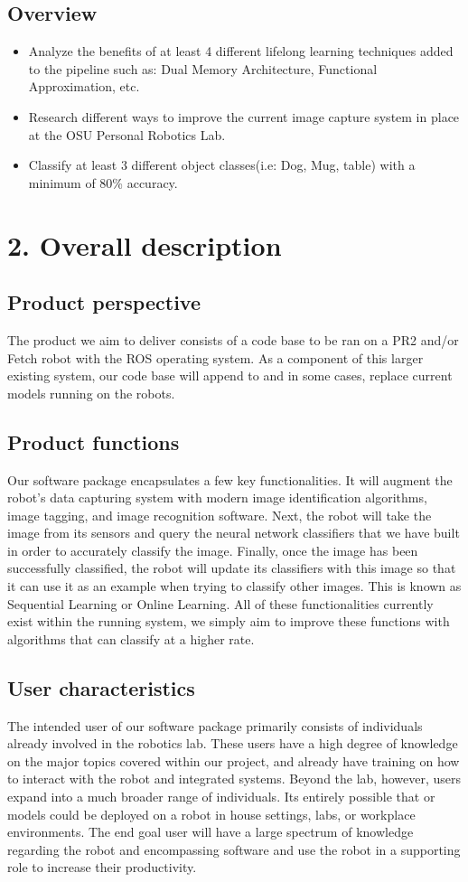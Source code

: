 \documentclass[draftclsnofoot, onecolumn, 10pt, compsoc]{IEEEtran}
\begin{document}
\subsection{Overview}
\begin{itemize}
\item Analyze the benefits of at least 4 different lifelong learning techniques added to the pipeline such as: Dual Memory Architecture, Functional Approximation, etc.
\item Research different ways to improve the current image capture system in place at the OSU Personal Robotics Lab. 
\item Classify at least 3 different object classes(i.e: Dog, Mug, table) with a minimum of 80\% accuracy.
\end{itemize}
\section{2. Overall description}
\subsection{Product perspective}
The product we aim to deliver consists of a code base to be ran on a PR2 and/or Fetch robot with the ROS operating system. As a component of this larger existing system, our code base will append to and in some cases, replace current models running on the robots. 

\subsection{Product functions}
Our software package encapsulates a few key functionalities. It will augment the robot's data capturing system with modern image identification algorithms, image tagging, and image recognition software. Next, the robot will take the image from its sensors and query the neural network classifiers that we have built in order to accurately classify the image. Finally, once the image has been successfully classified, the robot will update its classifiers with this image so that it can use it as an example when trying to classify other images. This is known as Sequential Learning or Online Learning. All of these functionalities currently exist within the running system, we simply aim to improve these functions with algorithms that can classify at a higher rate.

\subsection{User characteristics}
The intended user of our software package primarily consists of individuals already involved in the robotics lab. These users have a high degree of knowledge on the major topics covered within our project, and already have training on how to interact with the robot and integrated systems. Beyond the lab, however, users expand into a much broader range of individuals. Its entirely possible that or models could be deployed on a robot in house settings, labs, or workplace environments. The end goal user will have a large spectrum of knowledge regarding the robot and encompassing software and use the robot in a supporting role to increase their productivity.
\end{document}
